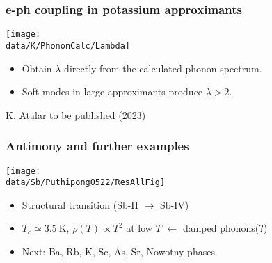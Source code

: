 \begin{frame}
\frametitle{e-ph coupling in potassium approximants}

\centerline{\texttt{[image: \\data/K/PhononCalc/Lambda]}}

\begin{itemize}
\item
Obtain $\lambda$ directly from the calculated phonon spectrum.
\item
Soft modes in large approximants produce $\lambda > 2$.

\end{itemize}

\vspace*{\fill}

\centerline{\makebox[\linewidth]{\rule{0.85\textwidth}{0.4pt}}}
\centerline{\scriptsize K. Atalar to be published (2023)}

\end{frame}


\begin{frame}[label=SbRes]
\frametitle{Antimony and further examples}


\centerline{\texttt{[image: \\data/Sb/Puthipong0522/ResAllFig]}}


\begin{itemize}
\item Structural transition (Sb-II $\rightarrow$ Sb-IV)
\item $T_c \simeq 3.5 ~ \text{K}$,  $\rho(T)\propto T^2$ at low $T$ $\leftarrow$ damped phonons(?)
\item Next: Ba, Rb, K, Sc, As, Sr, Nowotny phases

\end{itemize}

\end{frame}

